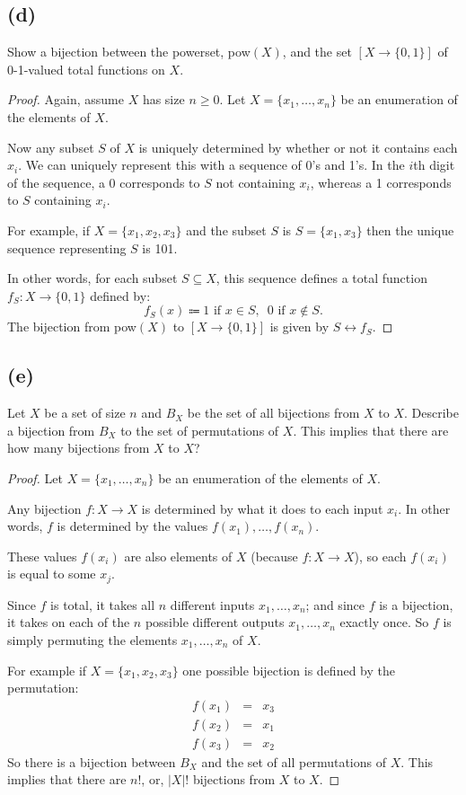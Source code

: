 \documentclass[14pt]{extarticle}
\begin{document}
\subsection{(d)}
Show a bijection between the powerset, pow$(X)$, and the set $[X \to \{0,1\}]$ of 0-1-valued total functions on $X$.
\begin{proof}
Again, assume $X$ has size $n\geq 0$. Let $X = \{x_1, \ldots, x_n\}$ be an enumeration of the elements of $X$. 

Now any subset $S$ of $X$ is uniquely determined by whether or not it contains each $x_i$. We can uniquely represent this with a sequence of 0's and 1's. In the $i$th digit of the sequence, a 0 corresponds to $S$ not containing $x_i$, whereas a 1 corresponds to $S$ containing $x_i$.

For example, if $X = \{x_1, x_2, x_3\}$ and the subset $S$ is $S = \{x_1, x_3\}$ then the unique sequence representing $S$ is 101.

In other words, for each subset $S \subseteq X$, this sequence defines a total function $f_S : X \to \{0,1\}$ defined by:
$$
f_S(x) \Coloneqq 1 \text{ if } x \in S, \,\,\, 0 \text{ if } x \notin S.
$$
The bijection from pow$(X)$ to $[X \to \{0,1\}]$ is given by $S \longleftrightarrow f_S$.
\end{proof}

\subsection{(e)}
Let $X$ be a set of size $n$ and $B_X$ be the set of all bijections from $X$ to $X$. Describe a bijection from $B_X$ to the set of permutations of $X$. This implies that there are how many bijections from $X$ to $X$?
\begin{proof}
Let $X = \{x_1, \ldots, x_n\}$ be an enumeration of the elements of $X$. 

Any bijection $f: X \to X$ is determined by what it does to each input $x_i$. In other words, $f$ is determined by the values $f(x_1), \ldots, f(x_n)$.

These values $f(x_i)$ are also elements of $X$ (because $f: X \to X$), so each $f(x_i)$ is equal to some $x_j$. 

Since $f$ is total, it takes all $n$ different inputs $x_1, \ldots, x_n$; and since $f$ is a bijection, it takes on each of the $n$ possible different outputs $x_1, \ldots, x_n$ exactly once. So $f$ is simply permuting the elements $x_1, \ldots, x_n$ of $X$.

For example if $X = \{x_1, x_2, x_3\}$ one possible bijection is defined by the permutation: 
$$
\begin{array}{ccc}
f(x_1) &=& x_3\\ 
f(x_2) &=& x_1\\ 
f(x_3) &=& x_2
\end{array}
$$
So there is a bijection between $B_X$ and the set of all permutations of $X$. This implies that there are $n!$, or, $|X|!$ bijections from $X$ to $X$.
\end{proof}
\end{document}
